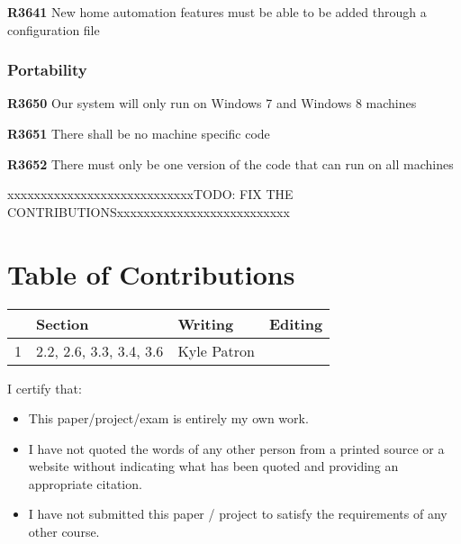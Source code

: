 \documentclass{article}
\begin{document}
\textbf{R3641} New home automation features must be able to be added through a configuration file

\subsubsection{Portability}
\textbf{R3650} Our system will only run on Windows 7 and Windows 8 machines 

\textbf{R3651} There shall be no machine specific code

\textbf{R3652} There must only be one version of the code that can run on all machines


\newpage
{\color{red}xxxxxxxxxxxxxxxxxxxxxxxxxxxxTODO: FIX THE CONTRIBUTIONSxxxxxxxxxxxxxxxxxxxxxxxxxx}
\section*{\centering Table of Contributions}
\begin{tabular}{| l | l | l | l |}
    \hline
     & Section & Writing & Editing \\
    \hline \hline
    1 & 2.2, 2.6, 3.3, 3.4, 3.6  & Kyle Patron & \\ \hline
\end{tabular}
\newpage
\noindent I certify that:
\begin{itemize}
\item This paper/project/exam is entirely my own work.
\item I have not quoted the words of any other person from a printed source or a website without indicating what has been quoted and providing an appropriate citation.
\item I have not submitted this paper / project to satisfy the requirements of any other course.
\end{itemize}

\vspace{1cm}
\noindent{}


\vspace{0.5cm}
\noindent{}

\vspace{0.5cm}
\noindent{}
\end{document}
